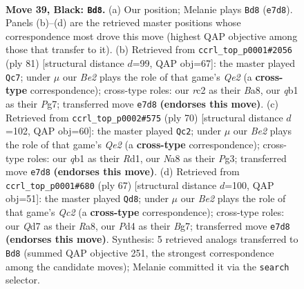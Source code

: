 \documentclass[11pt]{article}
\begin{document}
\clearpage

\begin{figure}[p]\centering
\begin{subfigure}{0.46\textwidth}\centering
\resizebox{\linewidth}{!}{%
\newchessgame
\chessboard[
  setfen={n1r3k1/pb1qb1n1/5r2/P1p2p1p/3p1Pp1/1P4P1/2R1P1BP/RQBNN1K1 b - - 11 39},
  showmover=false,
  pgfstyle=straightmove, color=movearrow, markmove={e7-d8}
]}
\caption{}
\end{subfigure}\hfill
\begin{subfigure}{0.46\textwidth}\centering
\resizebox{\linewidth}{!}{%
\newchessgame
\chessboard[
  setfen={b2r2k1/4q1p1/1p1pprn1/6b1/PpP4p/1P3P1P/2Q1N1PB/R2R1B1K b - - 3 41},
  showmover=false,
  pgfstyle=straightmove, color=movearrow, markmove={e7-c7}
]}
\caption{}
\end{subfigure}
\\[4pt]
\begin{subfigure}{0.46\textwidth}\centering
\resizebox{\linewidth}{!}{%
\newchessgame
\chessboard[
  setfen={b2rr3/2qn1pbk/pp1pp1pp/8/P1PNP2P/1P2BPPB/4Q2K/2RR4 w - - 14 36},
  showmover=false,
  pgfstyle=straightmove, color=movearrow, markmove={e2-c2}
]}
\caption{}
\end{subfigure}\hfill
\begin{subfigure}{0.46\textwidth}\centering
\resizebox{\linewidth}{!}{%
\newchessgame
\chessboard[
  setfen={rr6/2q1p1bk/1p2bnp1/2p1p2p/P3P3/2N1B1PP/1R3P2/1RQ2BK1 b - - 6 34},
  showmover=false,
  pgfstyle=straightmove, color=movearrow, markmove={c7-d8}
]}
\caption{}
\end{subfigure}
\caption{\textbf{Move 39, Black: \texttt{Bd8}.} (a) Our position; Melanie plays \texttt{Bd8} (\texttt{e7d8}). Panels (b)--(d) are the retrieved master positions whose correspondence most drove this move (highest QAP objective among those that transfer to it). (b) Retrieved from \texttt{ccrl\_top\_p0001\#2056} (ply 81) [structural distance $d$=99, QAP obj=67]: the master played \texttt{Qc7}; under $\mu$ our \emph{Be2} plays the role of that game's \emph{Qe2} (a \textbf{cross-type} correspondence); cross-type roles: our \emph{r}c2 as their \emph{B}a8, our \emph{q}b1 as their \emph{P}g7; transferred move \texttt{e7d8} \textbf{(endorses this move)}. (c) Retrieved from \texttt{ccrl\_top\_p0002\#575} (ply 70) [structural distance $d$=102, QAP obj=60]: the master played \texttt{Qc2}; under $\mu$ our \emph{Be2} plays the role of that game's \emph{Qe2} (a \textbf{cross-type} correspondence); cross-type roles: our \emph{q}b1 as their \emph{R}d1, our \emph{N}a8 as their \emph{P}g3; transferred move \texttt{e7d8} \textbf{(endorses this move)}. (d) Retrieved from \texttt{ccrl\_top\_p0001\#680} (ply 67) [structural distance $d$=100, QAP obj=51]: the master played \texttt{Qd8}; under $\mu$ our \emph{Be2} plays the role of that game's \emph{Qc2} (a \textbf{cross-type} correspondence); cross-type roles: our \emph{Q}d7 as their \emph{R}a8, our \emph{P}d4 as their \emph{B}g7; transferred move \texttt{e7d8} \textbf{(endorses this move)}. Synthesis: 5 retrieved analogs transferred to \texttt{Bd8} (summed QAP objective 251, the strongest correspondence among the candidate moves); Melanie committed it via the \texttt{search} selector.}
\label{fig:thought-m77}
\end{figure}
\end{document}
